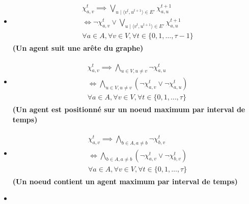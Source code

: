 \documentclass[french, 10pt, letterpaper]{article}
\theoremstyle{definition}
\theoremstyle{proposition}
\theoremstyle{example}
\begin{document}
    \begin{itemize}
        \item[] 
            \begin{align}
                \label{equ:contrainteA}
                \begin{split}
                    &\chi_{a, v}^t \implies \bigvee_{u\;|\;\langle v^t, u^{t+1} \rangle \in E'} \chi_{a, u}^{t+1}
                    \\&\iff \lnot \chi_{a, v}^t \lor \bigvee_{u\;|\;\langle v^t, u^{t+1} \rangle \in E'} \chi_{a, u}^{t+1}
                    \\&\forall a \in A, \forall v \in V, \forall t \in \{0, 1, \ldots, \tau-1\}
                \end{split}
            \end{align}
            \textbf{(Un agent suit une arête du graphe)}
        \item[] 
            \begin{align}
                \label{equ:contrainteB}
                \begin{split}
                    &\chi_{a, v}^t \implies \bigwedge_{u \in V, u \neq v} \lnot \chi_{a, u}^t
                    \\&\iff \bigwedge_{u \in V, u \neq v} (\lnot \chi_{a, v}^t \lor \lnot \chi_{a, u}^t)
                    \\&\forall a \in A, \forall v \in V, \forall t \in \{0, 1, \ldots, \tau\}
                \end{split}
            \end{align}
            \textbf{(Un agent est positionné sur un noeud maximum par interval de temps)}
        \item[] 
            \begin{align}
                \label{equ:contrainteC}
                \begin{split}
                    &\chi_{a, v}^t \implies \bigwedge_{b \in A, a \neq b} \lnot \chi_{b, v}^t
                    \\&\iff \bigwedge_{b \in A, a \neq b} (\lnot \chi_{a, v}^t \lor \lnot \chi_{b, v}^t)
                    \\&\forall a \in A, \forall v \in V, \forall t \in \{0, 1, \ldots, \tau\}
                \end{split}
            \end{align}
            \textbf{(Un noeud contient un agent maximum par interval de temps)}
        \item[] 
            \begin{align}

\end{align}
\end{itemize}
\end{document}
